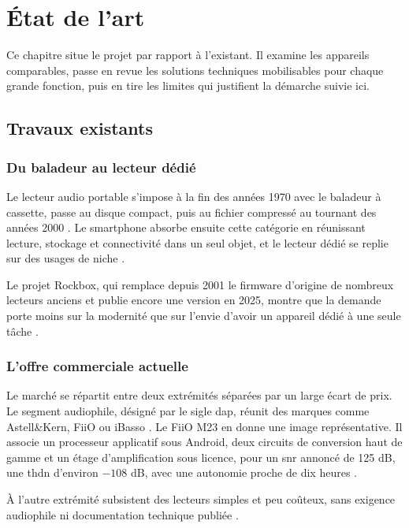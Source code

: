 \chapter{État de l'art}

Ce chapitre situe le projet par rapport à l'existant. Il examine les appareils comparables, passe en revue les solutions techniques mobilisables pour chaque grande fonction, puis en tire les limites qui justifient la démarche suivie ici.

\section{Travaux existants}

\subsection{Du baladeur au lecteur dédié}

Le lecteur audio portable s'impose à la fin des années 1970 avec le baladeur à cassette, passe au disque compact, puis au fichier compressé au tournant des années 2000 \cite{Wikipedia_Portable_Media_Player}. Le smartphone absorbe ensuite cette catégorie en réunissant lecture, stockage et connectivité dans un seul objet, et le lecteur dédié se replie sur des usages de niche \cite{Homecine_DAP_Comparison}.

Le projet Rockbox, qui remplace depuis 2001 le firmware d'origine de nombreux lecteurs anciens et publie encore une version en 2025, montre que la demande porte moins sur la modernité que sur l'envie d'avoir un appareil dédié à une seule tâche \cite{rockbox_project}.

\subsection{L'offre commerciale actuelle}

Le marché se répartit entre deux extrémités séparées par un large écart de prix. Le segment audiophile, désigné par le sigle \gls{dap}, réunit des marques comme Astell\&Kern, FiiO ou iBasso \cite{Tom-Smigla_20_Best_DAP}. Le FiiO M23 en donne une image représentative. Il associe un processeur applicatif sous Android, deux circuits de conversion haut de gamme et un étage d'amplification sous licence, pour un \gls{snr} annoncé de 125 dB, une \gls{thdn} d'environ $-108$ dB, avec une autonomie proche de dix heures \cite{fiio_M23}.

À l'autre extrémité subsistent des lecteurs simples et peu coûteux, sans exigence audiophile ni documentation technique publiée \cite{AudiophileOn_Best_Cheap_DAP}.

